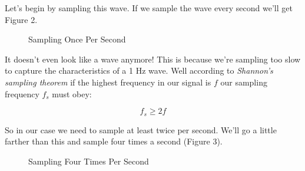 \documentclass[10pt,a5paper]{book}
\begin{document}
Let's begin by sampling this wave. If we sample the wave every second we'll get Figure 2. 

\begin{figure}[!htb]
\caption{\label{fig:my-label} Sampling Once Per Second}
\end{figure}

It doesn't even look like a wave anymore! This is because we're sampling too slow to capture the characteristics of a 1 Hz wave. Well according to \textit{Shannon's sampling theorem} \cite{practicalprocessing} if the highest frequency in our signal is $f$ our sampling frequency $f_s$ must obey:

\begin{equation}
f_s \geq 2f
\end{equation}

So in our case we need to sample at least twice per second. We'll go a little farther than this and sample four times a second (Figure 3).

\begin{figure}[!htb]
\caption{\label{fig:my-label} Sampling Four Times Per Second}
\end{figure}
\end{document}
